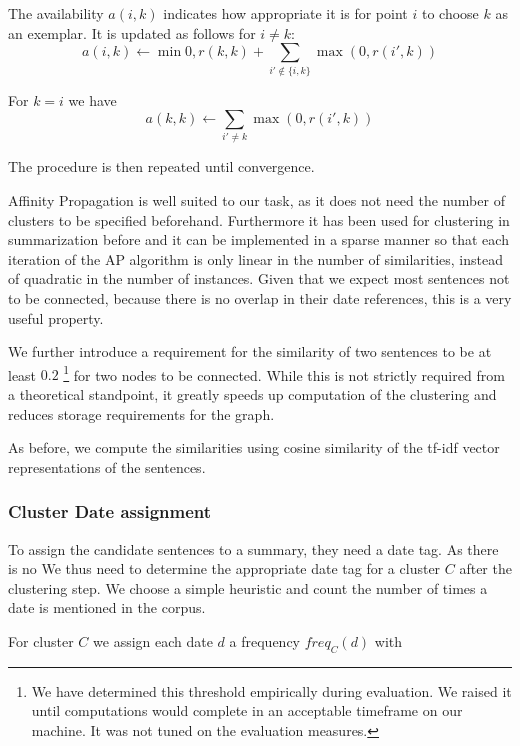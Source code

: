 \documentclass[a4paper,BCOR=10mm]{report}
\numberwithin{lemma}{chapter}
\numberwithin{definition}{chapter}
\begin{document}
The availability $a(i, k)$ indicates how appropriate it is for point $i$ to choose $k$ as an exemplar.
It is updated as follows for $i \neq k$:
\begin{equation}
a(i, k) \leftarrow \min 0, r(k, k) + \sum_{i' \not\in \{i, k\}} \max(0, r(i', k))
\end{equation}

For $k = i$ we have
\begin{equation}
a(k, k) \leftarrow \sum_{i' \neq k} \max(0, r(i', k))
\end{equation}

The procedure is then repeated until convergence.

Affinity Propagation is well suited to our task, as it does not need the number of clusters to be specified beforehand. Furthermore it has been used for clustering in summarization before \citep{salient-updates-disaster} and it can be implemented in a sparse manner so that each iteration of the AP algorithm is only linear in the number of similarities, instead of quadratic in the number of instances. Given that we expect most sentences not to be connected, because there is no overlap in their date references, this is a very useful property.

We further introduce a requirement for the similarity of two sentences to be at least $0.2$ \footnote{We have determined this threshold empirically during evaluation. We raised it until computations would complete in an acceptable timeframe on our machine. It was not tuned on the evaluation measures.} for two nodes to be connected. While this is not strictly required from a theoretical standpoint, it greatly speeds up computation of the clustering and reduces storage requirements for the graph.

As before, we compute the similarities using cosine similarity of the tf-idf vector representations of the sentences.

\subsubsection{Cluster Date assignment}

To assign the candidate sentences to a summary, they need a date tag. As there is no 
We thus need to determine the appropriate date tag for a cluster $C$ after the clustering step. We choose a simple heuristic and count the number of times a date is mentioned in the corpus.

For cluster $C$ we assign each date $d$ a frequency $\mathit{freq}_C(d)$ with
\end{document}
